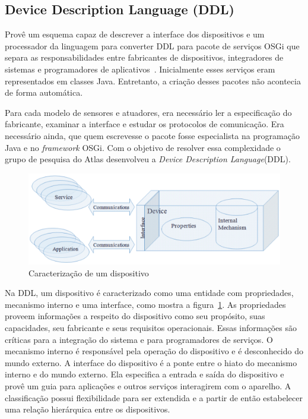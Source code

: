 \subsection{Device Description Language (DDL)}
\label{subsec:ddl}

Provê um esquema capaz de descrever a interface dos dispositivos e um processador da linguagem para converter DDL para pacote de serviços OSGi que separa as responsabilidades entre fabricantes de dispositivos, integradores de sistemas e programadores de aplicativos~\cite{gatorTechDDL}. Inicialmente esses serviços eram representados em classes Java. Entretanto, a criação desses pacotes não acontecia de forma automática. 

Para cada modelo de sensores e atuadores, era necessário ler a especificação do fabricante, examinar a interface e estudar os protocolos de comunicação. Era necessário ainda, que quem escrevesse o pacote fosse especialista na programação Java e no \emph{framework} OSGi. Com o objetivo de resolver essa complexidade o grupo de pesquisa do Atlas desenvolveu a \emph{Device Description Language}(DDL).

\begin{figure}[ht]
\center
\includegraphics[scale=0.4]{imagens/gatorDDL}
\caption{Caracterização de um dispositivo~\cite{ddlSpec}}
\label{fig:ddlspec}
\end{figure}

Na DDL, um dispositivo é caracterizado como uma entidade com propriedades, mecanismo interno e uma interface, como mostra a figura~\ref{fig:ddlspec}. As propriedades proveem informações a respeito do dispositivo como seu propósito, suas capacidades, seu fabricante e seus requisitos operacionais. Essas informações são críticas para a integração do sistema e para programadores de serviços. O mecanismo interno é responsável pela operação do dispositivo e é desconhecido do mundo externo. A interface do dispositivo é a ponte entre o hiato do mecanismo interno e do mundo externo. Ela especifica a entrada e saída do dispositivo e provê um guia para aplicações e outros serviços interagirem com o aparelho. A classificação possui flexibilidade para ser extendida e a partir de então estabelecer uma relação hierárquica entre os dispositivos.

